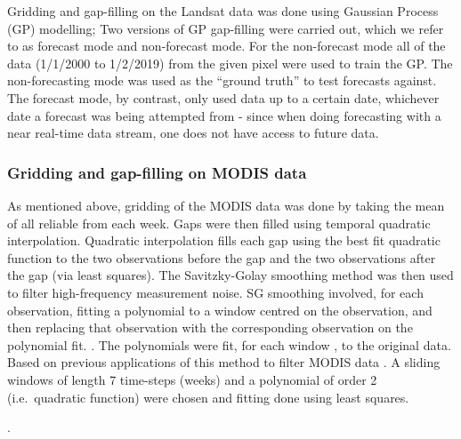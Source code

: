 \documentclass[review]{elsarticle}
\begin{document}
Gridding and gap-filling on the Landsat data was done using Gaussian Process (GP) modelling;  Two versions of GP gap-filling were carried out, which we refer to as forecast mode and non-forecast mode. For the non-forecast mode all of the data (1/1/2000 to 1/2/2019) from the given pixel were used to train the GP. The non-forecasting mode was used as the ``ground truth'' to test forecasts against. The forecast mode, by contrast, only used data up to a certain date, whichever date a forecast was being attempted from - since when doing forecasting with a near real-time data stream, one does not have access to future data. 

\subsubsection{Gridding and gap-filling on MODIS data} \label{sec:gapMODIS}


As mentioned above, gridding of the MODIS data was done by taking the mean of all reliable  from each week. Gaps were then filled using temporal quadratic interpolation. Quadratic interpolation fills each gap using the best fit quadratic function to the two observations before the gap and the two observations after the gap (via least squares). The Savitzky-Golay \citep[SG,][]{Savitzky1964} smoothing method was then used to filter high-frequency measurement noise. SG smoothing involved, for each observation, fitting a polynomial to a window centred on the observation, and then replacing that observation with the corresponding observation on the polynomial fit. . The polynomials were fit, for each  window , to the original data. {\color{red} Based on previous applications of this method to filter MODIS data \citep{bg-10-4055-2013,Chen2004}}. A sliding windows of length 7 time-steps (weeks) and a polynomial of order 2 (i.e.~quadratic function) were chosen and fitting done using least squares.

.
\end{document}
